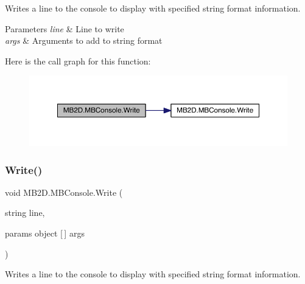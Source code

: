 Writes a line to the console to display with specified string format information. 


\begin{DoxyParams}{Parameters}
{\em line} & Line to write\\
\hline
{\em args} & Arguments to add to string format\\
\hline
\end{DoxyParams}
Here is the call graph for this function\+:\nopagebreak
\begin{figure}[H]
\begin{center}
\leavevmode
\includegraphics[width=350pt]{class_m_b2_d_1_1_m_b_console_a77bc48284eeebbc13eeced6451513c09_cgraph}
\end{center}
\end{figure}
\hypertarget{class_m_b2_d_1_1_m_b_console_ad7f7617e28472374b97fee653bd786be}{}\label{class_m_b2_d_1_1_m_b_console_ad7f7617e28472374b97fee653bd786be} 
\subsubsection{\texorpdfstring{Write()}{Write()}\hspace{0.1cm}{\footnotesize\ttfamily [3/3]}}
{\footnotesize\ttfamily void M\+B2\+D.\+M\+B\+Console.\+Write (\begin{DoxyParamCaption}\item[{string}]{line,  }\item[{params object \mbox{[}$\,$\mbox{]}}]{args }\end{DoxyParamCaption})\hspace{0.3cm}{\ttfamily [inline]}}



Writes a line to the console to display with specified string format information. 


